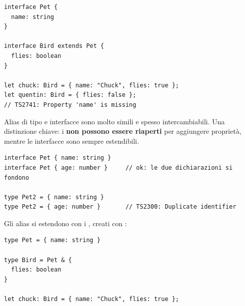 \begin{affianco}[0.5][c]
\begin{lstlisting}[style=ts]
interface Pet {
  name: string
}

interface Bird extends Pet {
  flies: boolean
}

let chuck: Bird = { name: "Chuck", flies: true };
let quentin: Bird = { flies: false };
// TS2741: Property 'name' is missing
\end{lstlisting}
\risultato
\begin{immagine}
\end{immagine}
\end{affianco}

Alias di tipo e interfacce sono molto simili e spesso intercambiabili. Una
distinzione chiave: i  \textbf{non possono essere riaperti} per
aggiungere proprietà, mentre le interfacce sono sempre estendibili.

\begin{lstlisting}[style=ts]
interface Pet { name: string }
interface Pet { age: number }     // ok: le due dichiarazioni si fondono

type Pet2 = { name: string }
type Pet2 = { age: number }       // TS2300: Duplicate identifier
\end{lstlisting}

Gli alias si estendono con i , creati con \code{\&}:

\begin{lstlisting}[style=ts]
type Pet = { name: string }

type Bird = Pet & {
  flies: boolean
}

let chuck: Bird = { name: "Chuck", flies: true };
\end{lstlisting}


